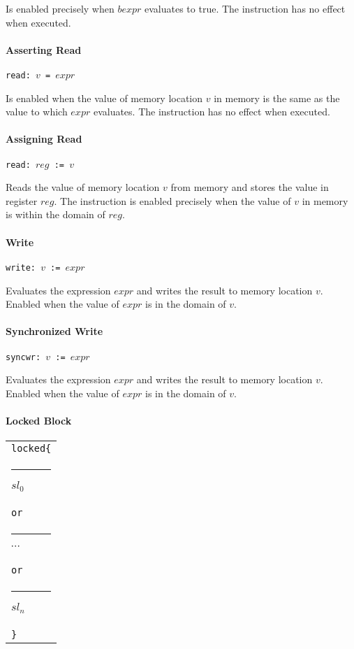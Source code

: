 \documentclass[a4paper]{article}
\begin{document}
Is enabled precisely when $bexpr$ evaluates to true. The instruction
has no effect when executed.

\paragraph{Asserting Read} \verb+read: +$v$\verb+ = +$expr$

Is enabled when the value of memory location $v$ in memory is the same
as the value to which $expr$ evaluates. The instruction has no effect
when executed.

\paragraph{Assigning Read} \verb+read: +$reg$\verb+ := +$v$

Reads the value of memory location $v$ from memory and stores the
value in register $reg$. The instruction is enabled precisely when the
value of $v$ in memory is within the domain of $reg$.

\paragraph{Write} \verb+write: +$v$\verb+ := +$expr$

Evaluates the expression $expr$ and writes the result to memory
location $v$. Enabled when the value of $expr$ is in the domain of
$v$.

\paragraph{Synchronized Write} \verb+syncwr: +$v$\verb+ := +$expr$

Evaluates the expression $expr$ and writes the result to memory
location $v$. Enabled when the value of $expr$ is in the domain of
$v$.

\paragraph{Locked Block} \mbox{}

\noindent
\begin{tabular}{@{}l@{}}
  \verb+locked{+\\
  \rule{5pt}{0pt}$sl_0$\\
  \verb+or+\\
  \rule{5pt}{0pt}$\cdots$\\
  \verb+or+\\
  \rule{5pt}{0pt}$sl_n$\\
  \verb+}+\\
\end{tabular}
\end{document}
